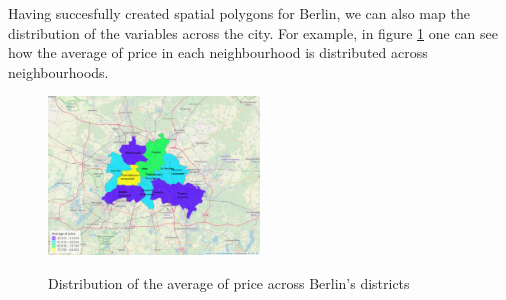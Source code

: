 Having succesfully created spatial polygons for Berlin, we can also map the distribution of the variables across the city. For example, in figure \ref{figure:priceavg} one can see how the average of price in each neighbourhood is distributed across neighbourhoods.

\begin{figure}[H]
\begin{center}
\includegraphics[width=0.5\textwidth, keepaspectratio]{price_map_distr} \\
\caption{Distribution of the average of price across Berlin's districts}
\label{figure:priceavg}
\end{center}
\end{figure}